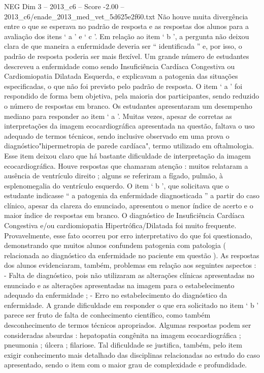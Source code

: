 \begin{textsample}{NEG Dim 3 – 2013\_c6 – Score -2.00 – 2013\_c6/enade\_2013\_med\_vet\_5d625e2f60.txt}
Não houve muita divergência entre o que se esperava no padrão de resposta e as respostas dos alunos para a avaliação dos itens ‘ a ’ e ‘ c ’.
Em relação ao item ‘ b ’, a pergunta não deixou clara de que maneira a enfermidade deveria ser “ identificada ” e, por isso, o padrão de resposta poderia ser mais flexível.
Um grande número de estudantes descreveu a enfermidade como sendo Insuficiência Cardíaca Congestiva ou Cardiomiopatia Dilatada Esquerda, e explicavam a patogenia das situações especificadas, o que não foi previsto pelo padrão de resposta.
O item ‘ a ’ foi respondido de forma bem objetiva, pela maioria dos participantes, sendo reduzido o número de respostas em branco.
Os estudantes apresentaram um desempenho mediano para responder ao item ‘ a ’.
Muitas vezes, apesar de corretas as interpretações da imagem ecocardiográfica apresentada na questão, faltava o uso adequado de termos técnicos, sendo inclusive observado em uma prova o diagnóstico"hipermetropia de parede cardíaca", termo utilizado em oftalmologia.
Esse item deixou claro que há bastante dificuldade de interpretação da imagem ecocardiográfica.
Houve respostas que chamaram atenção : muitos relataram a ausência de ventrículo direito ; alguns se referiram a fígado, pulmão, à esplenomegalia do ventrículo esquerdo.
O item ‘ b ’, que solicitava que o estudante indicasse “ a patogenia da enfermidade diagnosticada ” a partir do caso clínico, apesar da clareza do enunciado, apresentou o menor índice de acerto e o maior índice de respostas em branco.
O diagnóstico de Insuficiência Cardíaca Congestiva e/ou cardiomiopatia Hipertrófica/Dilatada foi muito frequente.
Provavelmente, esse fato ocorreu por erro interpretativo do que foi questionado, demonstrando que muitos alunos confundem patogenia com patologia ( relacionada ao diagnóstico da enfermidade no paciente em questão ).
As respostas dos alunos evidenciaram, também, problemas em relação aos seguintes aspectos : - Falta de diagnóstico, pois não utilizaram as alterações clínicas apresentadas no enunciado e as alterações apresentadas na imagem para o estabelecimento adequado da enfermidade ; - Erro no estabelecimento do diagnóstico da enfermidade.
A grande dificuldade em responder o que era solicitado no item ‘ b ’ parece ser fruto de falta de conhecimento científico, como também desconhecimento de termos técnicos apropriados.
Algumas respostas podem ser consideradas absurdas : hepatopatia congênita na imagem ecocardiográfica ; pneumonia ; úlcera ; filariose.
Tal dificuldade se justifica, também, pelo item exigir conhecimento mais detalhado das disciplinas relacionadas ao estudo do caso apresentado, sendo o item com o maior grau de complexidade e profundidade.

\end{textsample}
